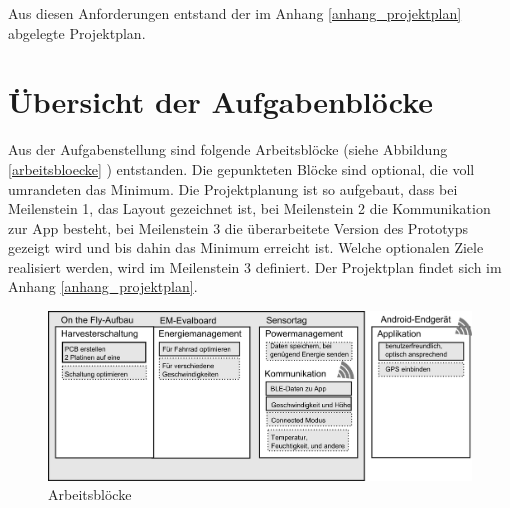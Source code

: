 Aus diesen Anforderungen entstand der im Anhang \ref{anhang_projektplan} abgelegte Projektplan.

\section{Übersicht der Aufgabenblöcke}
Aus der Aufgabenstellung sind folgende Arbeitsblöcke (siehe Abbildung \ref{arbeitsbloecke} ) entstanden. Die gepunkteten Blöcke sind optional, die voll umrandeten das Minimum. Die Projektplanung ist so aufgebaut, dass bei Meilenstein 1, das Layout gezeichnet ist, bei Meilenstein 2 die Kommunikation zur App besteht, bei Meilenstein 3 die überarbeitete Version des Prototyps gezeigt wird und bis dahin das Minimum erreicht ist. Welche optionalen Ziele realisiert werden, wird im Meilenstein 3 definiert. Der Projektplan findet sich im Anhang \ref{anhang_projektplan}.

\begin{figure}[h]
    \includegraphics[width=15cm]{../ressources/Projektorganisation/Arbeitsbloecke.png} 
    \caption{Arbeitsblöcke}
\end{figure}\label{arbeitsbloecke} 

